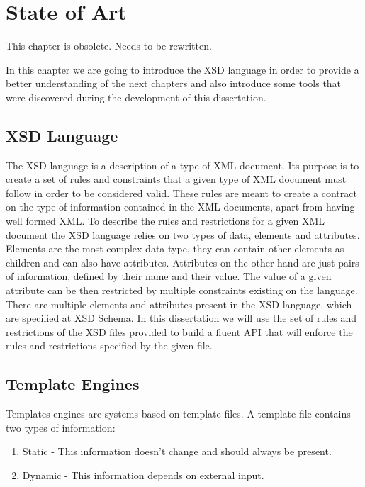 \chapter{State of Art}
\label{cha:stateofart}

This chapter is obsolete. Needs to be rewritten.

In this chapter we are going to introduce the \ac{XSD} language in order to provide a better understanding of the next chapters and also introduce some tools that were discovered during the development of this dissertation. 

\section{XSD Language} %
\label{sec:xsd}

The \ac{XSD} language is a description of a type of \ac{XML} document. Its purpose is to create a set of rules and constraints that a given type of \ac{XML} document must follow in order to be considered valid. These rules are meant to create a contract on the type of information contained in the \ac{XML} documents, apart from having well formed \ac{XML}. To describe the rules and restrictions for a given \ac{XML} document the \ac{XSD} language relies on two types of data, elements and attributes. Elements are the most complex data type, they can contain other elements as children and can also have attributes. Attributes on the other hand are just pairs of information, defined by their name and their value. The value of a given attribute can be then restricted by multiple constraints existing on the language. There are multiple elements and attributes present in the \ac{XSD} language, which are specified at \href{http://www.datypic.com/sc/xsd/s-xmlschema.xsd.html}{XSD Schema}. In this dissertation we will use the set of rules and restrictions of the \ac{XSD} files provided to build a fluent \ac{API} that will enforce the rules and restrictions specified by the given file.

\section{Template Engines}
\label{sec:templateengines}

Templates engines are systems based on template files. A template file contains two types of information:

\begin{enumerate}
\item Static - This information doesn't change and should always be present.
\item Dynamic - This information depends on external input.
\end{enumerate}

